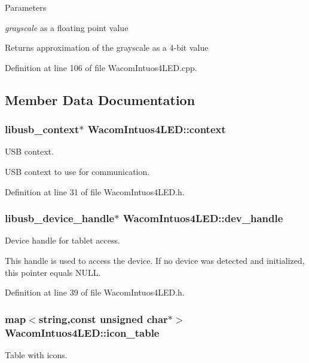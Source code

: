 \begin{DoxyParams}{Parameters}
\item[{\em grayscale}]as a floating point value\end{DoxyParams}
\begin{DoxyReturn}{Returns}
approximation of the grayscale as a 4-\/bit value 
\end{DoxyReturn}


Definition at line 106 of file WacomIntuos4LED.cpp.



\subsection{Member Data Documentation}
\hypertarget{classWacomIntuos4LED_a20d7e60936642f82fc06ab227c34ee9b}{
\subsubsection[{context}]{\setlength{\rightskip}{0pt plus 5cm}libusb\_\-context$\ast$ {\bf WacomIntuos4LED::context}}}
\label{classWacomIntuos4LED_a20d7e60936642f82fc06ab227c34ee9b}
USB context.

USB context to use for communication. 

Definition at line 31 of file WacomIntuos4LED.h.

\hypertarget{classWacomIntuos4LED_a8afbdadc8bb470ca82ac4c117f431177}{
\subsubsection[{dev\_\-handle}]{\setlength{\rightskip}{0pt plus 5cm}libusb\_\-device\_\-handle$\ast$ {\bf WacomIntuos4LED::dev\_\-handle}}}
\label{classWacomIntuos4LED_a8afbdadc8bb470ca82ac4c117f431177}
Device handle for tablet access.

This handle is used to access the device. If no device was detected and initialized, this pointer equals NULL. 

Definition at line 39 of file WacomIntuos4LED.h.

\hypertarget{classWacomIntuos4LED_afaf5e54e94691f75468a57596f871ff2}{
\subsubsection[{icon\_\-table}]{\setlength{\rightskip}{0pt plus 5cm}map$<$string,const unsigned char$\ast$$>$ {\bf WacomIntuos4LED::icon\_\-table}}}
\label{classWacomIntuos4LED_afaf5e54e94691f75468a57596f871ff2}
Table with icons.

